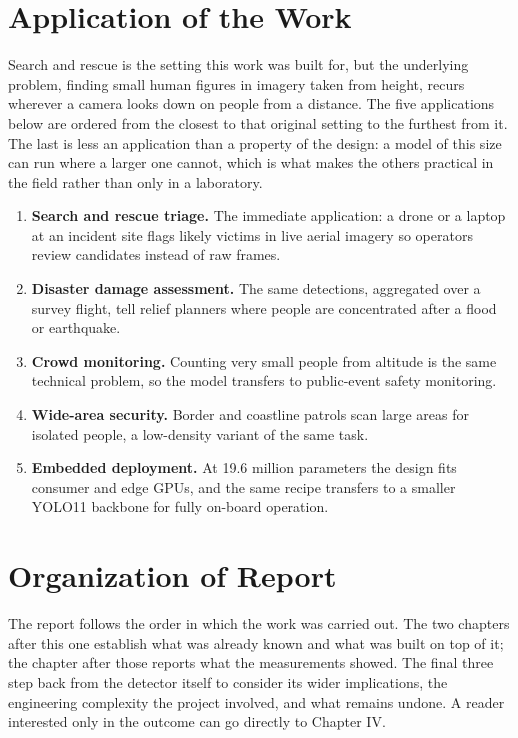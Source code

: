 \section{Application of the Work}

Search and rescue is the setting this work was built for, but the underlying
problem, finding small human figures in imagery taken from height, recurs
wherever a camera looks down on people from a distance. The five applications
below are ordered from the closest to that original setting to the furthest from
it. The last is less an application than a property of the design: a model of
this size can run where a larger one cannot, which is what makes the others
practical in the field rather than only in a laboratory.

\begin{enumerate}
  \item \textbf{Search and rescue triage.} The immediate application: a
        drone or a laptop at an incident site flags likely victims in live
        aerial imagery so operators review candidates instead of raw frames.
  \item \textbf{Disaster damage assessment.} The same detections, aggregated
        over a survey flight, tell relief planners where people are
        concentrated after a flood or earthquake.
  \item \textbf{Crowd monitoring.} Counting very small people from altitude
        is the same technical problem, so the model transfers to public-event
        safety monitoring.
  \item \textbf{Wide-area security.} Border and coastline patrols scan large
        areas for isolated people, a low-density variant of the same task.
  \item \textbf{Embedded deployment.} At 19.6 million parameters the design
        fits consumer and edge GPUs, and the same recipe transfers to a
        smaller YOLO11 backbone for fully on-board operation.
\end{enumerate}

\section{Organization of Report}

The report follows the order in which the work was carried out. The two chapters
after this one establish what was already known and what was built on top of it;
the chapter after those reports what the measurements showed. The final three
step back from the detector itself to consider its wider implications, the
engineering complexity the project involved, and what remains undone. A reader
interested only in the outcome can go directly to Chapter IV.

